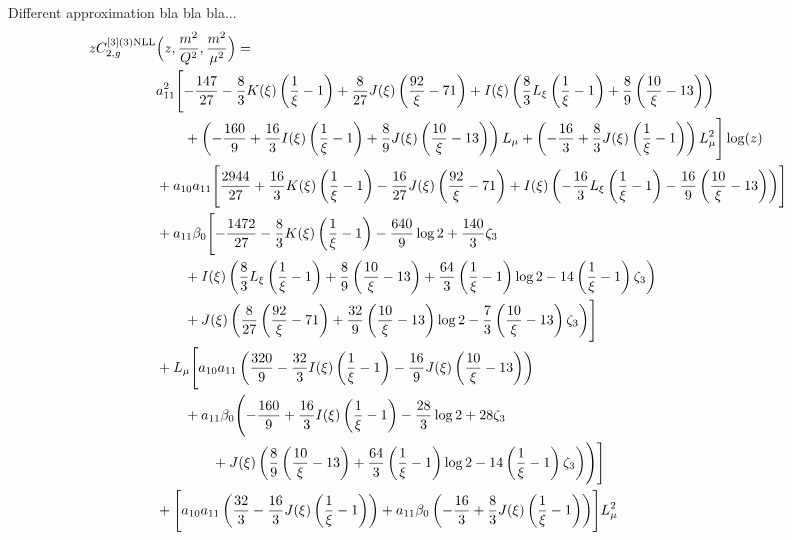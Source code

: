 \documentclass[a4paper]{article}
\begin{document}
Different approximation bla bla bla...
\begin{equation}
	\begin{split}
		z C_{2,g}^{[3](3) \rm NLL}&\Bigl(z,\frac{m^2}{Q^2},\frac{m^2}{\mu^2}\Bigr)= \\
		& a_{11}^2\Biggl[-\frac{147}{27} - \frac{8}{3} K(\xi) \left(\frac{1}{\xi}-1\right) + \frac{8}{27} J(\xi) \left(\frac{92}{\xi} - 71\right) + I(\xi) \left(\frac{8}{3} L_\xi \left(\frac{1}{\xi}-1\right) + \frac{8}{9} \left(\frac{10}{\xi} - 13\right)\right) \\
		& \qquad + \left(-\frac{160}{9} + \frac{16}{3} I(\xi) \left(\frac{1}{\xi}-1\right) + \frac{8}{9} J(\xi) \left(\frac{10}{\xi} - 13\right)\right) L_\mu + \left(-\frac{16}{3} + \frac{8}{3} J(\xi) \left(\frac{1}{\xi}-1\right)\right) L_\mu^2\Biggr] \log(z) \\
		& + a_{10} a_{11} \Biggl[\frac{2944}{27} + \frac{16}{3} K(\xi) \left(\frac{1}{\xi} - 1\right) - \frac{16}{27} J(\xi) \left(\frac{92}{\xi} - 71\right) + I(\xi) \left(-\frac{16}{3} L_\xi \left(\frac{1}{\xi} - 1\right) - \frac{16}{9} \left(\frac{10}{\xi} - 13\right)\right) \Biggr] \\
		& + a_{11} \beta_0 \Biggl[ -\frac{1472}{27} - \frac{8}{3} K(\xi) \left(\frac{1}{\xi} - 1\right) - \frac{640}{9} \log 2 + \frac{140}{3} \zeta_3 \\
		& \qquad + I(\xi) \left(\frac{8}{3} L_\xi \left(\frac{1}{\xi} - 1\right) + \frac{8}{9} \left(\frac{10}{\xi} - 13\right) + \frac{64}{3} \left(\frac{1}{\xi} - 1\right) \log 2 - 14 \left(\frac{1}{\xi} - 1\right) \zeta_3\right) \\
		& \qquad + J(\xi) \left(\frac{8}{27} \left(\frac{92}{\xi} - 71\right) + \frac{32}{9} \left(\frac{10}{\xi} - 13\right) \log 2 - \frac{7}{3} \left(\frac{10}{\xi} - 13\right) \zeta_3 \right)\Biggr] \\
		& + L_\mu \Biggl[a_{10} a_{11} \left(\frac{320}{9} - \frac{32}{3} I(\xi) \left(\frac{1}{\xi} - 1\right) - \frac{16}{9} J(\xi) \left(\frac{10}{\xi} - 13\right)\right) \\
		& \qquad + a_{11} \beta_0 \Biggl(-\frac{160}{9} + \frac{16}{3} I(\xi) \left(\frac{1}{\xi} - 1\right) - \frac{28}{3} \log 2 + 28 \zeta_3 \\
		& \qquad \qquad+ J(\xi) \left(\frac{8}{9} \left(\frac{10}{\xi} - 13\right) + \frac{64}{3} \left(\frac{1}{\xi} - 1\right) \log 2 - 14 \left(\frac{1}{\xi} - 1\right) \zeta_3 \right)\Biggr)\Biggr]\\
		& + \Biggl[a_{10} a_{11} \left(\frac{32}{3} - \frac{16}{3} J(\xi) \left(\frac{1}{\xi} - 1\right)\right) + a_{11} \beta_0 \left(-\frac{16}{3} + \frac{8}{3} J(\xi) \left(\frac{1}{\xi} - 1\right)\right)\Biggr] L_\mu^2
	\end{split}
\end{equation}
\end{document}
